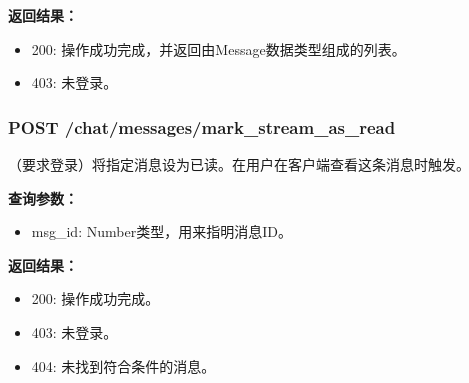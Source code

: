 \textbf{返回结果：}
    \begin{itemize}
    \item 200: 操作成功完成，并返回由Message数据类型组成的列表。
    \item 403: 未登录。
    \end{itemize}

\subsubsection{\textbf{POST} /chat/messages/mark_stream_as_read}
（要求登录）将指定消息设为已读。在用户在客户端查看这条消息时触发。

\textbf{查询参数：}
    \begin{itemize}
        \item msg\_id: Number类型，用来指明消息ID。
    \end{itemize}

\textbf{返回结果：}
    \begin{itemize}
    \item 200: 操作成功完成。
    \item 403: 未登录。
    \item 404: 未找到符合条件的消息。
    \end{itemize}